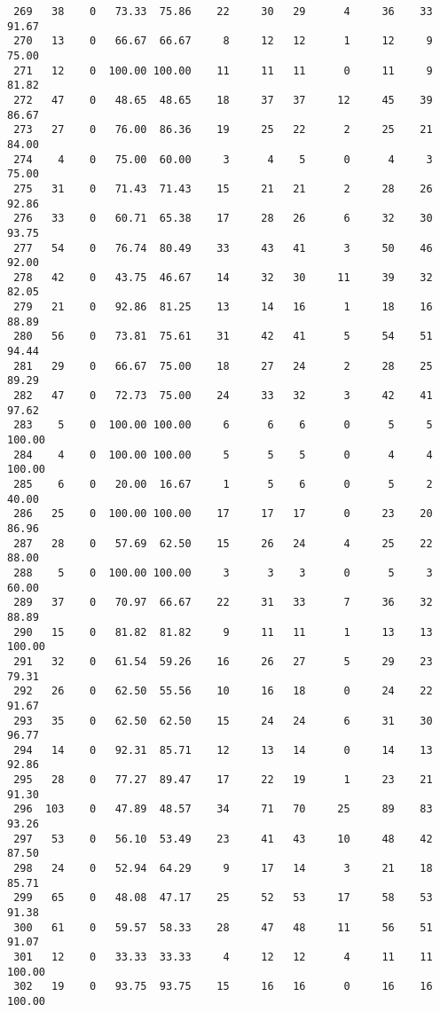 \begin{verbatim}
 269   38    0   73.33  75.86    22     30   29      4     36    33    91.67
 270   13    0   66.67  66.67     8     12   12      1     12     9    75.00
 271   12    0  100.00 100.00    11     11   11      0     11     9    81.82
 272   47    0   48.65  48.65    18     37   37     12     45    39    86.67
 273   27    0   76.00  86.36    19     25   22      2     25    21    84.00
 274    4    0   75.00  60.00     3      4    5      0      4     3    75.00
 275   31    0   71.43  71.43    15     21   21      2     28    26    92.86
 276   33    0   60.71  65.38    17     28   26      6     32    30    93.75
 277   54    0   76.74  80.49    33     43   41      3     50    46    92.00
 278   42    0   43.75  46.67    14     32   30     11     39    32    82.05
 279   21    0   92.86  81.25    13     14   16      1     18    16    88.89
 280   56    0   73.81  75.61    31     42   41      5     54    51    94.44
 281   29    0   66.67  75.00    18     27   24      2     28    25    89.29
 282   47    0   72.73  75.00    24     33   32      3     42    41    97.62
 283    5    0  100.00 100.00     6      6    6      0      5     5   100.00
 284    4    0  100.00 100.00     5      5    5      0      4     4   100.00
 285    6    0   20.00  16.67     1      5    6      0      5     2    40.00
 286   25    0  100.00 100.00    17     17   17      0     23    20    86.96
 287   28    0   57.69  62.50    15     26   24      4     25    22    88.00
 288    5    0  100.00 100.00     3      3    3      0      5     3    60.00
 289   37    0   70.97  66.67    22     31   33      7     36    32    88.89
 290   15    0   81.82  81.82     9     11   11      1     13    13   100.00
 291   32    0   61.54  59.26    16     26   27      5     29    23    79.31
 292   26    0   62.50  55.56    10     16   18      0     24    22    91.67
 293   35    0   62.50  62.50    15     24   24      6     31    30    96.77
 294   14    0   92.31  85.71    12     13   14      0     14    13    92.86
 295   28    0   77.27  89.47    17     22   19      1     23    21    91.30
 296  103    0   47.89  48.57    34     71   70     25     89    83    93.26
 297   53    0   56.10  53.49    23     41   43     10     48    42    87.50
 298   24    0   52.94  64.29     9     17   14      3     21    18    85.71
 299   65    0   48.08  47.17    25     52   53     17     58    53    91.38
 300   61    0   59.57  58.33    28     47   48     11     56    51    91.07
 301   12    0   33.33  33.33     4     12   12      4     11    11   100.00
 302   19    0   93.75  93.75    15     16   16      0     16    16   100.00

\end{verbatim}
